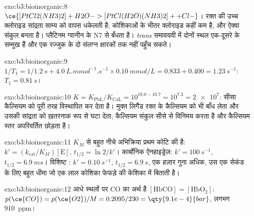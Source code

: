\begin{solution}{exo:b3:bioinorganic:8}
$\ce{[PtCl2(NH3)2] + H2O -> [PtCl(H2O)(NH3)2]+ + Cl-}$। रक्त की उच्च क्लोराइड सांद्रता
साम्य को वापस धकेलती है; कोशिकाओं के भीतर क्लोराइड कहीं कम है, और ऐक्वा
संकुल बनता है। प्लैटिनम ग्वानीन के N7 से बँधता है। \textit{trans} समावयवी में दोनों
 स्थल एक-दूसरे के सम्मुख हैं और एक रज्जुक के दो संलग्न क्षारकों तक
नहीं पहुँच सकते।
\end{solution}

\begin{solution}{exo:b3:bioinorganic:9}
$1/T_1 = 1/\qty{1.2}{s} + \qty{4.0}{L.mmol^{-1}.s^{-1}} \times \qty{0.10}{mmol/L} = 0.833 + 0.400 = \qty{1.23}{s^{-1}}$: $T_1 = \qty{0.81}{s}$।
\end{solution}

\begin{solution}{exo:b3:bioinorganic:10}
$K = K_{\mathrm{PbL}}/K_{\mathrm{CaL}} = 10^{18.0 - 10.7} = 10^{7.3} = \num{2e7}$: सीसा कैल्सियम को पूरी तरह विस्थापित कर देता है। मुक्त
लिगैंड रक्त के कैल्सियम को भी बाँध लेता और उसकी सांद्रता को ख़तरनाक रूप से
घटा देता; कैल्सियम संकुल सीसे से विनिमय करता है और कैल्सियम
स्तर अपरिवर्तित छोड़ता है।
\end{solution}

\begin{solution}{exo:b3:bioinorganic:11}
$K_M$ से बहुत नीचे अभिक्रिया प्रथम कोटि की है: $k' = (k_{\mathrm{cat}}/K_M)[\mathrm E]$, $t_{1/2} = \ln 2/k'$। कार्बोनिक
ऐनहाइड्रेज़: $k' = \qty{100}{s^{-1}}$, $t_{1/2} = \qty{6.9}{ms}$। विशिष्ट : $k' = \qty{0.10}{s^{-1}}$, $t_{1/2} = \qty{6.9}{s}$, एक हज़ार
गुना अधिक, उस एक सेकंड के लिए बहुत धीमा जो एक लाल कोशिका फेफड़े की केशिका में बिताती है।
\end{solution}

\begin{solution}{exo:b3:bioinorganic:12}
आधे स्थलों पर CO का अर्थ है $[\mathrm{HbCO}] = [\mathrm{HbO_2}]$: $p(\ce{CO}) = p(\ce{O2})/M = 0.2095/230 = \qty{9.1e-4}{bar}$, लगभग
\qty{910}{ppm}।
\end{solution}


